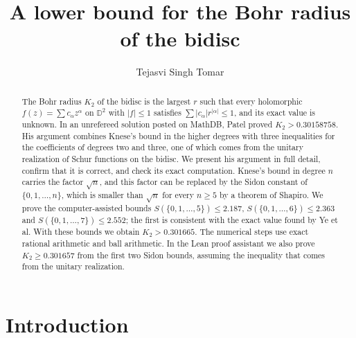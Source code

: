 \documentclass[11pt]{amsart}
\theoremstyle{remark}
\numberwithin{equation}{section}
\newcommand{\D}{\mathbb{D}}
\newcommand{\Kbound}{0.301665}
\newcommand{\PatelLB}{0.30158758}
\newcommand{\FiveOwn}{2.187}
\newcommand{\SixOwn}{2.363}
\newcommand{\LeanBound}{0.301657}
\newcommand{\SevenOwn}{2.552}
\begin{document}
\title[The Bohr radius of the bidisc]{A lower bound for the Bohr radius of the bidisc}
\author{Tejasvi Singh Tomar}
\renewcommand{\urladdrname}{{\itshape ORCID}}

\begin{abstract}
The Bohr radius $K_2$ of the bidisc is the largest $r$ such that every holomorphic $f(z)=\sum c_\alpha z^\alpha$ on $\D^2$ with $|f|\le1$ satisfies $\sum|c_\alpha|r^{|\alpha|}\le1$, and its exact value is unknown. In an unrefereed solution posted on MathDB, Patel proved $K_2>\PatelLB$. His argument combines Knese's bound in the higher degrees with three inequalities for the coefficients of degrees two and three, one of which comes from the unitary realization of Schur functions on the bidisc. We present his argument in full detail, confirm that it is correct, and check its exact computation. Knese's bound in degree $n$ carries the factor $\sqrt n$, and this factor can be replaced by the Sidon constant of $\{0,1,\dots,n\}$, which is smaller than $\sqrt n$ for every $n\ge5$ by a theorem of Shapiro. We prove the computer-assisted bounds $S(\{0,1,\dots,5\})\le\FiveOwn$, $S(\{0,1,\dots,6\})\le\SixOwn$ and $S(\{0,1,\dots,7\})\le\SevenOwn$; the first is consistent with the exact value found by Ye et al. With these bounds we obtain $K_2>\Kbound$. The numerical steps use exact rational arithmetic and ball arithmetic. In the Lean proof assistant we also prove $K_2\ge\LeanBound$ from the first two Sidon bounds, assuming the inequality that comes from the unitary realization.
\end{abstract}

\maketitle

\section{Introduction}
\end{document}
